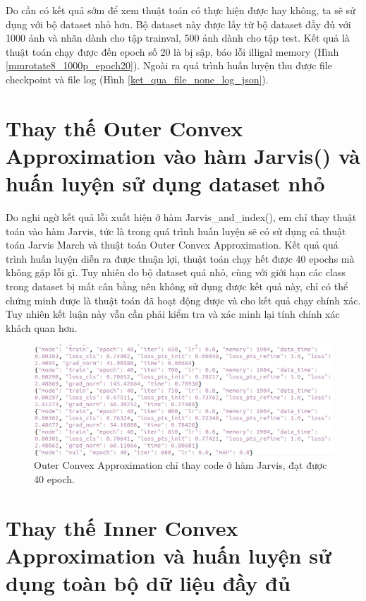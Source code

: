 \documentclass[12pt,a4paper,openany,oneside]{report}
\begin{document}
Do cần có kết quả sớm để xem thuật toán có thực hiện được hay không, ta sẽ sử dụng với bộ dataset nhỏ hơn. Bộ dataset này được lấy từ bộ dataset đầy đủ với 1000 ảnh và nhãn dành cho tập trainval, 500 ảnh dành cho tập test. Kết quả là thuật toán chạy được đến epoch số 20 là bị sập, báo lỗi illigal memory (Hình \ref{mmrotate8_1000p_epoch20}). Ngoài ra quá trình huấn luyện thu được file checkpoint  và file log (Hình \ref{ket_qua_file_none_log_json}).

\section{Thay thế Outer Convex Approximation vào hàm Jarvis() và huấn luyện sử dụng dataset nhỏ}

Do nghi ngờ kết quả lỗi xuất hiện ở hàm Jarvis\_and\_index(), em chỉ thay thuật toán vào hàm Jarvis, tức là trong quá trình huấn luyện sẽ có sử dụng cả thuật toán Jarvis March và thuật toán Outer Convex Approximation. Kết quả quá trình huấn luyện diễn ra được thuận lợi, thuật toán chạy hết được 40 epochs mà không gặp lỗi gì. Tuy nhiên do bộ dataset quá nhỏ, cùng với giới hạn các class trong dataset bị mất cân bằng nên không sử dụng được kết quả này, chỉ có thể chứng minh được là thuật toán đã hoạt động được và cho kết quả chạy chính xác. Tuy nhiên kết luận này vẫn cần phải kiểm tra và xác minh lại tính chính xác khách quan hơn.

\begin{figure}[ht!]
	\begin{center}
		\includegraphics[width=450px]{./outer_just_javis_smalldata_40epoch.JPG}
		\caption{Outer Convex Approximation chỉ thay code ở hàm Jarvis, đạt được 40 epoch.}
		\label{outer_just_javis_smalldata_40epoch}
	\end{center}
\end{figure} 
\section{Thay thế Inner Convex Approximation và huấn luyện sử dụng toàn bộ dữ liệu đầy đủ}
\end{document}
